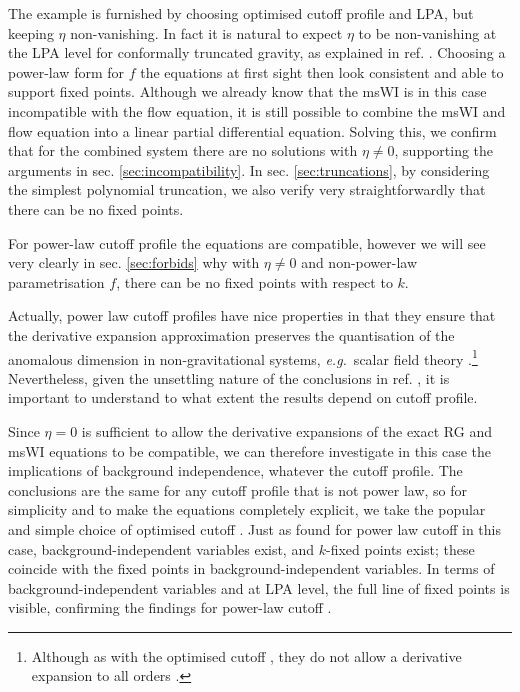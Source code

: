 \documentclass[11pt,a4paper]{article}
\numberwithin{figure}{section}
\numberwithin{equation}{section}
\newcommand\eg{\textit{e.g.}\ }
\begin{document}
The example is furnished by choosing optimised cutoff profile and LPA, but keeping $\eta$ non-vanishing.
In fact it is natural to expect $\eta$ to be non-vanishing at the LPA level for conformally truncated gravity, as explained in ref. \cite{Dietz2016}.  Choosing a power-law form for $f$ the equations at first sight then look consistent and able to support fixed points. Although we already know that the msWI is in this case incompatible with the flow equation, it is still possible to combine the msWI and flow equation into a linear partial differential equation. Solving this, we confirm that for the combined system there are no solutions with $\eta\ne0$, supporting the arguments in sec. \ref{sec:incompatibility}. In sec. \ref{sec:truncations}, by considering the simplest polynomial truncation, we also verify very straightforwardly that there can be no fixed points. 

For power-law cutoff profile the equations are compatible, however we will see very clearly in sec. \ref{sec:forbids} why with $\eta\ne0$ and non-power-law parametrisation $f$, there can be no fixed points with respect to $k$.

Actually, power law cutoff profiles have nice properties in  that they ensure that the derivative expansion approximation preserves the quantisation of the anomalous dimension in non-gravitational systems, \eg scalar field theory \cite{Morris:1994ie,Morris:1994jc,Morris:1998}.\footnote{Although as with the optimised cutoff \cite{opt1,opt3}, they do not allow a derivative expansion to all orders \cite{Morris:2005ck,Morris1999,Morris2001}.} Nevertheless, given the unsettling nature of the conclusions in ref. \cite{Dietz:2015owa}, it is important to understand  to what extent the results depend on cutoff profile. 

Since $\eta=0$ is sufficient to allow the derivative expansions of the exact RG and msWI equations to be compatible, we can therefore investigate in this case the implications of background independence, whatever the cutoff profile. The conclusions are the same for any cutoff profile that is not power law, so for simplicity and to make the equations completely explicit, we take the popular and simple choice of optimised cutoff \cite{opt1,opt3}.  Just as found for power law cutoff \cite{Dietz2016} in this case, background-independent variables exist, and $k$-fixed points exist; these coincide with the fixed points in background-independent variables.  In terms of background-independent variables and at LPA level, the full line of fixed points
is visible, confirming the findings for power-law cutoff \cite{Dietz2016}.
\end{document}
